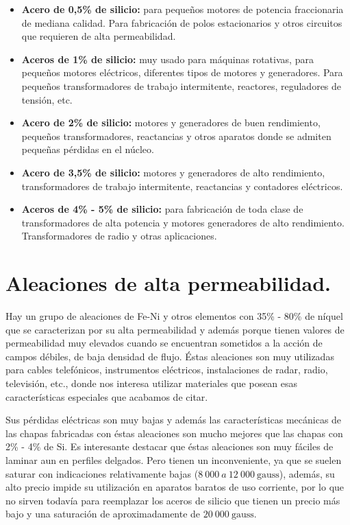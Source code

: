 \documentclass[12pt,a4paper]{article}
\begin{document}
\begin{itemize}
    \item \textbf{Acero de 0,5\% de silicio:} para pequeños motores de potencia fraccionaria de mediana calidad. Para fabricación de polos estacionarios y otros circuitos que requieren de alta permeabilidad.
    \item \textbf{Aceros de 1\% de silicio:} muy usado para máquinas rotativas, para pequeños motores eléctricos, diferentes tipos de motores y generadores. Para pequeños transformadores de trabajo intermitente, reactores, reguladores de tensión, etc.
    \item \textbf{Acero de 2\% de silicio:} motores y generadores de buen rendimiento, pequeños transformadores, reactancias y otros aparatos donde se admiten pequeñas pérdidas en el núcleo.
    \item \textbf{Acero de 3,5\% de silicio:} motores y generadores de alto rendimiento, transformadores de trabajo intermitente, reactancias y contadores eléctricos.
    \item \textbf{Aceros de 4\% - 5\% de silicio:} para fabricación de toda clase de transformadores de alta potencia y motores generadores de alto rendimiento. Transformadores de radio y otras aplicaciones.
\end{itemize}

\section{Aleaciones de alta permeabilidad.}

Hay un grupo de aleaciones de Fe-Ni y otros elementos con 35\% - 80\% de níquel que se caracterizan por su alta permeabilidad y además porque tienen valores de permeabilidad muy elevados cuando se encuentran sometidos a la acción de campos débiles, de baja densidad de flujo. Éstas aleaciones son muy utilizadas para cables telefónicos, instrumentos eléctricos, instalaciones de radar, radio, televisión, etc., donde nos interesa utilizar materiales que posean esas características especiales que acabamos de citar.

Sus pérdidas eléctricas son muy bajas y además las características mecánicas de las chapas fabricadas con éstas aleaciones son mucho mejores que las chapas con 2\% - 4\% de Si. Es interesante destacar que éstas aleaciones son muy fáciles de laminar aun en perfiles delgados. Pero tienen un inconveniente, ya que se suelen saturar con indicaciones relativamente bajas ($8\ 000\ a\ 12\ 000\ \mathrm{gauss}$), además, su alto precio impide su utilización en aparatos baratos de uso corriente, por lo que no sirven todavía para reemplazar los aceros de silicio que tienen un precio más bajo y una saturación de aproximadamente de $20\ 000\ \mathrm{gauss}$.
\end{document}
